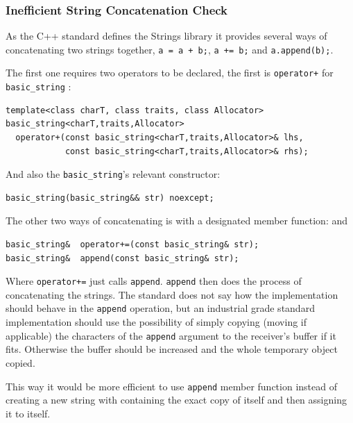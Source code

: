 \subsubsection{Inefficient String Concatenation Check}
\par As the C++ standard defines the Strings library it provides several ways of concatenating two strings together, \verb|a = a + b;|, \verb|a += b;| and \verb|a.append(b);|. \medskip
\par The first one requires two operators to be declared, the first is \verb|operator+| for \verb|basic_string| \cite[\S21.4.8.1]{cpp_standard}:
\begin{verbatim}
template<class charT, class traits, class Allocator>
basic_string<charT,traits,Allocator>
  operator+(const basic_string<charT,traits,Allocator>& lhs,
            const basic_string<charT,traits,Allocator>& rhs);
\end{verbatim}
\par And also the \verb|basic_string|'s relevant constructor:
\begin{verbatim}
basic_string(basic_string&& str) noexcept;
\end{verbatim}
\par The other two ways of concatenating is with a designated member function: \cite[\S21.4.6.1]{cpp_standard} and \cite[\S21.4.6.2]{cpp_standard}
\begin{verbatim}
basic_string&  operator+=(const basic_string& str);
basic_string&  append(const basic_string& str);
\end{verbatim}
\par Where \verb|operator+=| just calls \verb|append|. \verb|append| then does the process of concatenating the strings. The standard does not say how the implementation should behave in the \verb|append| operation, but an industrial grade standard implementation should use the possibility of simply copying (moving if applicable) the characters of the \verb|append| argument to the receiver's buffer if it fits. Otherwise the buffer should be increased and the whole temporary object copied. \medskip
\par This way it would be more efficient to use \verb|append| member function instead of creating a new string with containing the exact copy of itself and then assigning it to itself.
